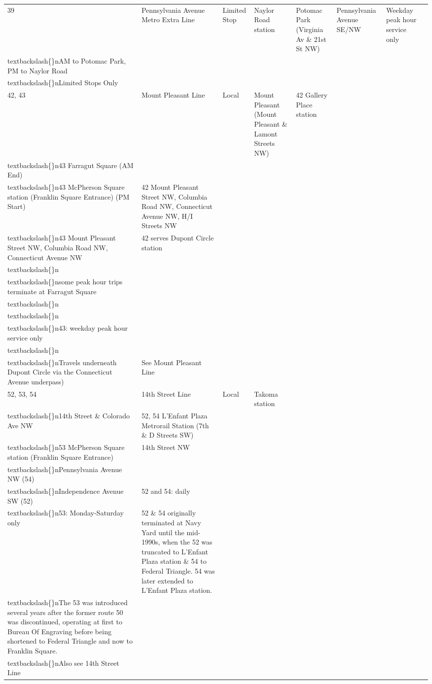 \documentclass{article}
\begin{document}
\begin{tabular}{llllllll}
39 & Pennsylvania Avenue Metro Extra Line & Limited Stop & Naylor Road station & Potomac Park (Virginia Av \& 21st St NW) & Pennsylvania Avenue SE/NW & Weekday peak hour service only\\textbackslash\{\}nAM to Potomac Park, PM to Naylor Road\\textbackslash\{\}nLimited Stops Only &  \\
42, 43 & Mount Pleasant Line & Local & Mount Pleasant (Mount Pleasant \& Lamont Streets NW) & 42 Gallery Place station\\textbackslash\{\}n43 Farragut Square (AM End)\\textbackslash\{\}n43 McPherson Square station (Franklin Square Entrance) (PM Start) & 42 Mount Pleasant Street NW, Columbia Road NW, Connecticut Avenue NW, H/I Streets NW\\textbackslash\{\}n43 Mount Pleasant Street NW, Columbia Road NW, Connecticut Avenue NW & 42 serves Dupont Circle station\\textbackslash\{\}n\\textbackslash\{\}nsome peak hour trips terminate at Farragut Square\\textbackslash\{\}n\\textbackslash\{\}n\\textbackslash\{\}n43: weekday peak hour service only\\textbackslash\{\}n\\textbackslash\{\}nTravels underneath Dupont Circle via the Connecticut Avenue underpass) & See Mount Pleasant Line \\
52, 53, 54 & 14th Street Line & Local & Takoma station\\textbackslash\{\}n14th Street \& Colorado Ave NW & 52, 54 L'Enfant Plaza Metrorail Station (7th \& D Streets SW)\\textbackslash\{\}n53 McPherson Square station (Franklin Square Entrance) & 14th Street NW\\textbackslash\{\}nPennsylvania Avenue NW (54)\\textbackslash\{\}nIndependence Avenue SW (52) & 52 and 54: daily\\textbackslash\{\}n53: Monday-Saturday only & 52 \& 54 originally terminated at Navy Yard until the mid-1990s, when the 52 was truncated to L'Enfant Plaza station \& 54 to Federal Triangle. 54 was later extended to L'Enfant Plaza station.\\textbackslash\{\}nThe 53 was introduced several years after the former route 50 was discontinued, operating at first to Bureau Of Engraving before being shortened to Federal Triangle and now to Franklin Square.\\textbackslash\{\}nAlso see 14th Street Line \\

\end{tabular}
\end{document}
